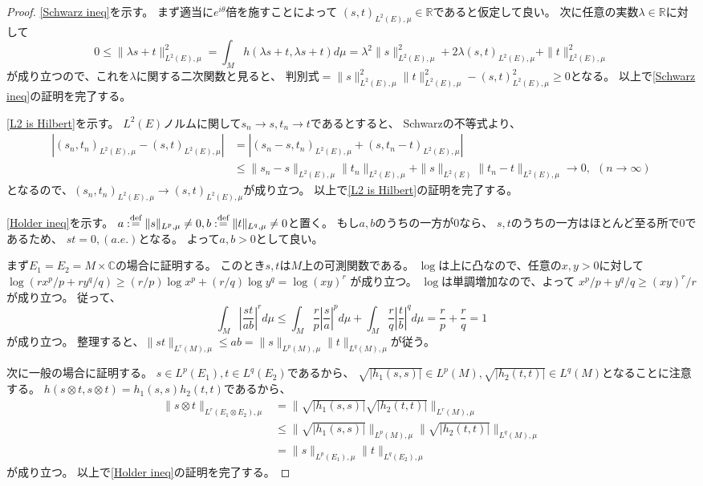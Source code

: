 \documentclass[uplatex]{jsarticle}
\theoremstyle{definition}
\newcommand{\dfn}{:\overset{\mbox{{\scriptsize def}}}{=}}
\newcommand{\C}{\mathbb{C}}
\newcommand{\R}{\mathbb{R}}
\begin{document}
\begin{proof}
  \ref{Schwarz ineq}を示す。
  まず適当に\(e^{i\theta}\)倍を施すことによって
  \((s,t)_{L^2(E),\mu}\in \R\)であると仮定して良い。
  次に任意の実数\(\lambda\in \R\)に対して
  \[
  0\leq \|\lambda s+t\|_{L^2(E),\mu}^2
  = \int_M h(\lambda s+t,\lambda s+t)d\mu
  = \lambda^2 \|s\|_{L^2(E),\mu}^2 + 2\lambda (s,t)_{L^2(E),\mu} + \|t\|_{L^2(E),\mu}^2
  \]
  が成り立つので、これを\(\lambda\)に関する二次関数と見ると、
  判別式\(= \|s\|_{L^2(E),\mu}^2\|t\|_{L^2(E),\mu}^2 - (s,t)_{L^2(E),\mu}^2 \geq 0\)となる。
  以上で\ref{Schwarz ineq}の証明を完了する。

  \ref{L2 is Hilbert}を示す。
  \(L^2(E)\)ノルムに関して\(s_n\to s, t_n\to t\)であるとすると、
  Schwarzの不等式より、
  \begin{align*}
    |(s_n,t_n)_{L^2(E),\mu} - (s,t)_{L^2(E),\mu}|
    &= |(s_n-s,t_n)_{L^2(E),\mu} + (s,t_n-t)_{L^2(E),\mu}| \\
    &\leq \|s_n-s\|_{L^2(E),\mu}\|t_n\|_{L^2(E),\mu} + \|s\|_{L^2(E)}\|t_n-t\|_{L^2(E),\mu}
    \to 0, \ \ (n\to\infty)
  \end{align*}
  となるので、\((s_n,t_n)_{L^2(E),\mu} \to (s,t)_{L^2(E),\mu}\)が成り立つ。
  以上で\ref{L2 is Hilbert}の証明を完了する。

  \ref{Holder ineq}を示す。
  \(a\dfn \|s\|_{L^p,\mu} \neq 0, b\dfn \|t\|_{L^q,\mu}\neq 0\)と置く。
  もし\(a,b\)のうちの一方が\(0\)なら、
  \(s,t\)のうちの一方はほとんど至る所で\(0\)であるため、
  \(st = 0, (a.e.)\)となる。
  よって\(a,b > 0\)として良い。

  まず\(E_1 = E_2 = M\times \C\)の場合に証明する。
  このとき\(s,t\)は\(M\)上の可測関数である。
  \(\log\)は上に凸なので、任意の\(x,y > 0\)に対して
  \(\log(rx^p/p+ry^q/q) \geq (r/p)\log x^p + (r/q)\log y^q = \log (xy)^r\)
  が成り立つ。
  \(\log\)は単調増加なので、よって
  \(x^p/p + y^q/q \geq (xy)^r/r\)が成り立つ。
  従って、
  \[
  \int_M \left| \frac{st}{ab} \right|^r d\mu
  \leq \int_M \frac{r}{p}\left| \frac{s}{a} \right|^p d\mu
  + \int_M \frac{r}{q}\left| \frac{t}{b} \right|^q d\mu
  = \frac{r}{p} + \frac{r}{q} = 1
  \]
  が成り立つ。
  整理すると、\(\|st\|_{L^r(M),\mu} \leq ab = \|s\|_{L^p(M),\mu}\|t\|_{L^q(M),\mu}\)が従う。

  次に一般の場合に証明する。
  \(s\in L^p(E_1), t\in L^q(E_2)\)であるから、
  \(\sqrt{|h_1(s,s)|}\in L^p(M), \sqrt{|h_2(t,t)|}\in L^q(M)\)となることに注意する。
  \(h(s\otimes t,s\otimes t) = h_1(s,s)h_2(t,t)\)であるから、
  \begin{align*}
    \|s\otimes t\|_{L^r(E_1\otimes E_2),\mu}
    &= \|\sqrt{|h_1(s,s)|}\sqrt{|h_2(t,t)|}\|_{L^r(M),\mu} \\
    &\leq \|\sqrt{|h_1(s,s)|}\|_{L^p(M),\mu}\|\sqrt{|h_2(t,t)|}\|_{L^q(M),\mu} \\
    &= \|s\|_{L^p(E_1),\mu}\|t\|_{L^q(E_2),\mu}
  \end{align*}
  が成り立つ。
  以上で\ref{Holder ineq}の証明を完了する。


\end{proof}
\end{document}
